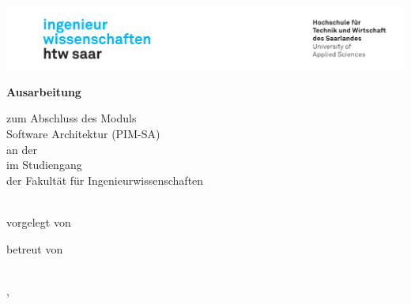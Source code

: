 \begin{titlepage}\linespread{1.5}\selectfont
\includegraphics[width=\linewidth]{Graphics/htwsaar_Logo_inwi_head_VF_4C_crop}
  \begin{center}
    \large  
    \hfill
    \vfill
    \begingroup
      \Large\bfseries Ausarbeitung
    \endgroup
		
		\bigskip
		
    zum Abschluss des Moduls \\
    Software Architektur (PIM-SA) \\ 
    an der \myUni \\
    im Studiengang \myDegreeCourse \\
    der Fakultät für Ingenieurwissenschaften \\ 
    
  \vfill
	
  \begingroup
    \Large\bfseries\myTitle 
  \endgroup
	
	\bigskip
	
  vorgelegt von \\
  \myName
	
  \vfill
	
  betreut von \\
  \myFirstProf \\
  \mySecondProf 
	
  \vfill
	
  \myLocation, \myTime                   

    \end{center}       
\end{titlepage}   